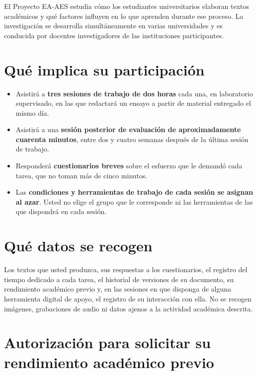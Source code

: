 \documentclass[10.5pt,a4paper]{article}
\begin{document}
El Proyecto EA-AES estudia c\'omo los estudiantes universitarios elaboran textos acad\'emicos y qu\'e factores influyen en lo que aprenden durante ese proceso. La investigaci\'on se desarrolla simult\'aneamente en varias universidades y es conducida por docentes investigadores de las instituciones participantes.

\section{Qu\'e implica su participaci\'on}

\begin{itemize}[leftmargin=1.1cm]
	\item Asistir\'a a \textbf{tres sesiones de trabajo de dos horas} cada una, en laboratorio supervisado, en las que redactar\'a un ensayo a partir de material entregado el mismo d\'ia.
	\item Asistir\'a a una \textbf{sesi\'on posterior de evaluaci\'on de aproximadamente cuarenta minutos}, entre dos y cuatro semanas despu\'es de la \'ultima sesi\'on de trabajo.
	\item Responder\'a \textbf{cuestionarios breves} sobre el esfuerzo que le demand\'o cada tarea, que no toman m\'as de cinco minutos.
	\item Las \textbf{condiciones y herramientas de trabajo de cada sesi\'on se asignan al azar}. Usted no elige el grupo que le corresponde ni las herramientas de las que dispondr\'a en cada sesi\'on.
\end{itemize}

\section{Qu\'e datos se recogen}

Los textos que usted produzca, sus respuestas a los cuestionarios, el registro del tiempo dedicado a cada tarea, el historial de versiones de su documento, su rendimiento acad\'emico previo y, en las sesiones en que disponga de alguna herramienta digital de apoyo, el registro de su interacci\'on con ella. No se recogen im\'agenes, grabaciones de audio ni datos ajenos a la actividad acad\'emica descrita.

\section{Autorizaci\'on para solicitar su rendimiento acad\'emico previo}
\end{document}
